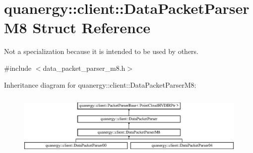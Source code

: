 \hypertarget{structquanergy_1_1client_1_1DataPacketParserM8}{\section{quanergy\-:\-:client\-:\-:Data\-Packet\-Parser\-M8 Struct Reference}
\label{structquanergy_1_1client_1_1DataPacketParserM8}
}


Not a specialization because it is intended to be used by others.  




{\ttfamily \#include $<$data\-\_\-packet\-\_\-parser\-\_\-m8.\-h$>$}

Inheritance diagram for quanergy\-:\-:client\-:\-:Data\-Packet\-Parser\-M8\-:\begin{figure}[H]
\begin{center}
\leavevmode
\includegraphics[height=3.128492cm]{structquanergy_1_1client_1_1DataPacketParserM8}
\end{center}
\end{figure}

